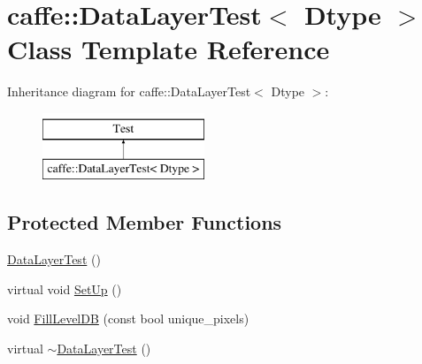 \hypertarget{classcaffe_1_1_data_layer_test}{\section{caffe\+:\+:Data\+Layer\+Test$<$ Dtype $>$ Class Template Reference}
\label{classcaffe_1_1_data_layer_test}
}
Inheritance diagram for caffe\+:\+:Data\+Layer\+Test$<$ Dtype $>$\+:\begin{figure}[H]
\begin{center}
\leavevmode
\includegraphics[height=2.000000cm]{classcaffe_1_1_data_layer_test}
\end{center}
\end{figure}
\subsection*{Protected Member Functions}
\begin{DoxyCompactItemize}
\item 
\hyperlink{classcaffe_1_1_data_layer_test_ac4d32d60646a6b4f362ad9a934008f93}{Data\+Layer\+Test} ()
\item 
virtual void \hyperlink{classcaffe_1_1_data_layer_test_a67b66edfd71f6e3d7a5c0cda35b08d8a}{Set\+Up} ()
\item 
void \hyperlink{classcaffe_1_1_data_layer_test_a7877b2f9d2cb43b3afc867336562e308}{Fill\+Level\+D\+B} (const bool unique\+\_\+pixels)
\item 
virtual \hyperlink{classcaffe_1_1_data_layer_test_ab57a2320076b2d08574b9aa43091397f}{$\sim$\+Data\+Layer\+Test} ()
\end{DoxyCompactItemize}
